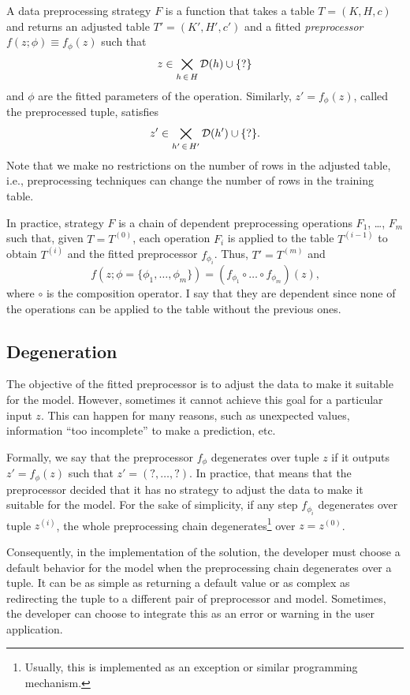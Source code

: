 A data preprocessing strategy $F$ is a function that takes a table $T = (K, H, c)$ and
returns an adjusted table $T' = (K', H', c')$ and a fitted \emph{preprocessor} $f(z; \phi)
\equiv f_\phi(z)$ such that $$z \in \bigtimes_{h\, \in\, H} \mathcal{D}\!\left(h\right) \cup \{?\}$$ and $\phi$ are
the fitted parameters of the operation.  Similarly, $z' = f_\phi(z)$, called the
preprocessed tuple, satisfies $$z' \in \bigtimes_{h'\, \in\, H'} \mathcal{D}\!\left(h'\right) \cup
\{?\}\text{.}$$ Note that we make no restrictions on the number of rows in the adjusted
table, i.e., preprocessing techniques can change the number of rows in the training table.

In practice, strategy $F$ is a chain of dependent preprocessing operations $F_1$, \dots,
$F_m$ such that, given $T = T^{(0)}$, each operation $F_i$ is applied to the table
$T^{(i-1)}$ to obtain $T^{(i)}$ and the fitted preprocessor $f_{\phi_i}$.  Thus, $T' =
T^{(m)}$ and $$f(z; \phi = \{\phi_1, \dots, \phi_m\}) = \left(f_{\phi_1} \circ \dots \circ
f_{\phi_m}\right)(z)\text{,}$$ where $\circ$ is the composition operator.  I say that
they are dependent since none of the operations can be applied to the table without the
previous ones.

\subsection{Degeneration}

The objective of the fitted preprocessor is to adjust the data to make it suitable for the
model.  However, sometimes it cannot achieve this goal for a particular input $z$.  This
can happen for many reasons, such as unexpected values, information ``too incomplete'' to
make a prediction, etc.

Formally, we say that the preprocessor $f_\phi$ degenerates over tuple $z$ if it outputs
$z' = f_\phi(z)$ such that $z' = (?, \dots, ?)$.  In practice, that means that the
preprocessor decided that it has no strategy to adjust the data to make it suitable for
the model.  For the sake of simplicity, if any step $f_{\phi_i}$ degenerates over
tuple $z^{(i)}$, the whole preprocessing chain degenerates\footnote{Usually, this is
implemented as an exception or similar programming mechanism.} over $z = z^{(0)}$.

Consequently, in the implementation of the solution, the developer must choose a default
behavior for the model when the preprocessing chain degenerates over a tuple.  It can
be as simple as returning a default value or as complex as redirecting the tuple to a
different pair of preprocessor and model.  Sometimes, the developer can choose to
integrate this as an error or warning in the user application.

